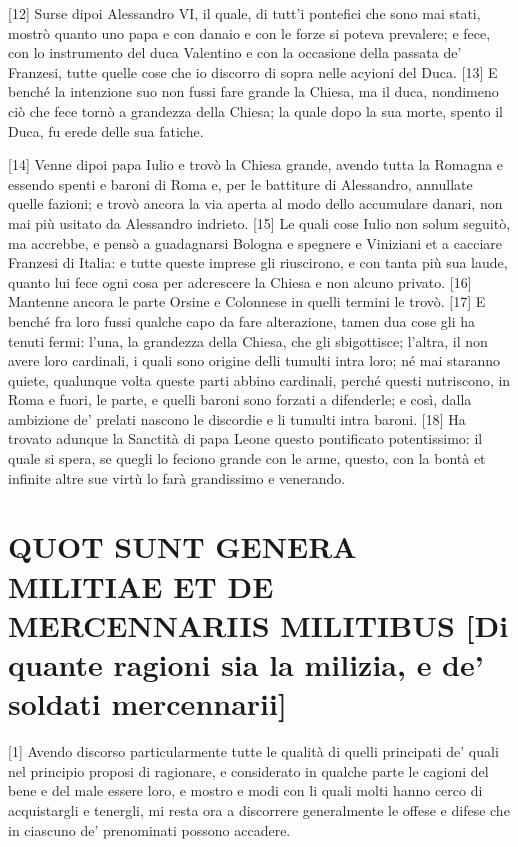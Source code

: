 {[}12{]} Surse dipoi Alessandro VI, il quale, di tutt'i pontefici che
sono mai stati, mostrò quanto uno papa e con danaio e con le forze si
poteva prevalere; e fece, con lo instrumento del duca Valentino e con la
occasione della passata de' Franzesi, tutte quelle cose che io discorro
di sopra nelle acyioni del Duca. {[}13{]} E benché la intenzione suo non
fussi fare grande la Chiesa, ma il duca, nondimeno ciò che fece tornò a
grandezza della Chiesa; la quale dopo la sua morte, spento il Duca, fu
erede delle sua fatiche.

{[}14{]} Venne dipoi papa Iulio e trovò la Chiesa grande, avendo tutta
la Romagna e essendo spenti e baroni di Roma e, per le battiture di
Alessandro, annullate quelle fazioni; e trovò ancora la via aperta al
modo dello accumulare danari, non mai più usitato da Alessandro
indrieto. {[}15{]} Le quali cose Iulio non solum seguitò, ma accrebbe, e
pensò a guadagnarsi Bologna e spegnere e Viniziani et a cacciare
Franzesi di Italia: e tutte queste imprese gli riuscirono, e con tanta
più sua laude, quanto lui fece ogni cosa per adcrescere la Chiesa e non
alcuno privato. {[}16{]} Mantenne ancora le parte Orsine e Colonnese in
quelli termini le trovò. {[}17{]} E benché fra loro fussi qualche capo
da fare alterazione, tamen dua cose gli ha tenuti fermi: l'una, la
grandezza della Chiesa, che gli sbigottisce; l'altra, il non avere loro
cardinali, i quali sono origine delli tumulti intra loro; né mai
staranno quiete, qualunque volta queste parti abbino cardinali, perché
questi nutriscono, in Roma e fuori, le parte, e quelli baroni sono
forzati a difenderle; e così, dalla ambizione de' prelati nascono le
discordie e li tumulti intra baroni. {[}18{]} Ha trovato adunque la
Sanctità di papa Leone questo pontificato potentissimo: il quale si
spera, se quegli lo feciono grande con le arme, questo, con la bontà et
infinite altre sue virtù lo farà grandissimo e venerando.

\quebra\section{QUOT SUNT GENERA MILITIAE ET DE MERCENNARIIS MILITIBUS
{[}Di quante ragioni sia la milizia, e de' soldati mercennarii{]}}

{[}1{]} Avendo discorso particularmente tutte le qualità di quelli
principati de' quali nel principio proposi di ragionare, e considerato
in qualche parte le cagioni del bene e del male essere loro, e mostro e
modi con li quali molti hanno cerco di acquistargli e tenergli, mi resta
ora a discorrere generalmente le offese e difese che in ciascuno de'
prenominati possono accadere.

